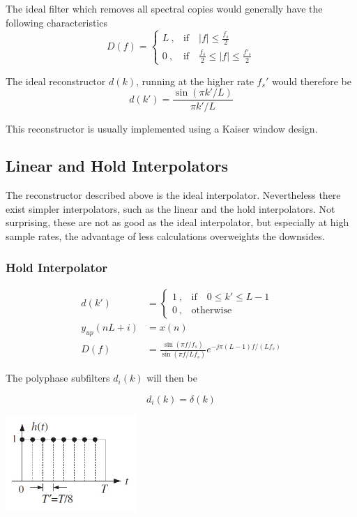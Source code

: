The ideal filter which removes all spectral copies would generally have 
the following characteristics
\begin{equation*}
	D(f) = \begin{cases}
		L\:,	& \text{if} \quad |f|\leq\frac{f_s}{2} \\
		0\:,	& \text{if} \quad \frac{f_s}{2}\leq |f|\leq\frac{f'_s}{2}
	\end{cases}
\end{equation*}

The ideal reconstructor $d(k)$, running at the higher rate $f_s'$ would
therefore be
\begin{equation*}
	d(k') = \frac{\sin(\pi k' / L)}{\pi k' / L}
\end{equation*}

This reconstructor is usually implemented using a Kaiser window design. 

\subsection{Linear and Hold Interpolators}
The reconstructor described above is the ideal interpolator. Nevertheless
there exist simpler interpolators, such as the linear and the hold interpolators.
Not surprising, these are not as good as the ideal interpolator, but especially
at high sample rates, the advantage of less calculations overweights the
downsides.

\subsubsection{Hold Interpolator}
\begin{multicols}{2}
	\begin{align*}
		d(k') &= \begin{cases}
			1\:, & \text{if} \quad 0\leq k' \leq L -1\\
			0\:, & \text{otherwise}
		\end{cases} \\
		y_{up}(nL+i) &= x(n) \\
		D(f) &= \frac{\sin(\pi f/f_s)}{\sin(\pi f/Lf_s)}e^{-j\pi(L-1)f/(Lf_s)}
	\end{align*}
	
	The polyphase subfilters $d_i(k)$ will then be
	
	\begin{equation*}
		d_i(k) = \delta(k)
	\end{equation*}
	
\vfill
\columnbreak
	\begin{center}
		\includegraphics[width=5cm]{images/IntDecOv_Hold.jpg}
	\end{center}	
\vfill
\end{multicols}


